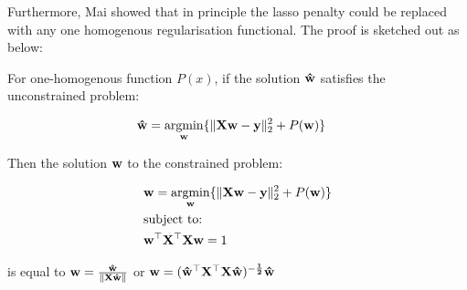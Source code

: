 Furthermore, Mai showed that in principle the lasso penalty could be replaced with any one homogenous regularisation functional. The proof is sketched out as below:

\begin{thm}

For one-homogenous function $P(x)$, if the solution $\bold{\hat{w}}$ satisfies the unconstrained problem:

\begin{align}
    & \bold{\hat{w}}=\underset{\bold{w}}{\mathrm{argmin}}\{ \|\bold{Xw-y}\|^2_2 + P(\bold{w}) \}
\end{align}

Then the solution $\bold{w}$ to the constrained problem: 

\begin{align}
    & \bold{w}=\underset{\bold{w}}{\mathrm{argmin}}\{ \|\bold{Xw-y}\|^2_2 + P(\bold{w}) \}\\
    & \text{subject to:} \notag\\
    & \bold{w^{\top}X^{\top}Xw}=1 \notag
\end{align}

is equal to $\bold{w}=\bold{\frac{\hat{w}}{\|X\hat{w}\|}}$ or $\bold{w}=\bold{(\hat{w}^{\top}X^{\top}X\hat{w})^{-\frac{1}{2}}\hat{w}}$

\end{thm}

